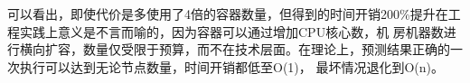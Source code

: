 可以看出，即使代价是多使用了4倍的容器数量，但得到的时间开销200\%提升在工程实践上意义是不言而喻的，因为容器可以通过增加CPU核心数，机
房机器数进行横向扩容，数量仅受限于预算，而不在技术层面。在理论上，预测结果正确的一次执行可以达到无论节点数量，时间开销都低至O(1)，
最坏情况退化到O(n)。

%


%
%
%
%
%
%
%
%
%
%
%
%
%
%
%
%

